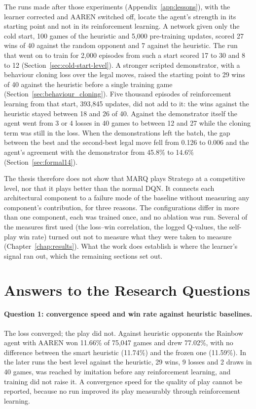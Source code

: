 The runs made after those experiments (Appendix~\ref{app:lessons}), with the learner corrected and AAREN switched off, locate the agent's strength in its starting point and not in its reinforcement learning. A network given only the cold start, 100 games of the heuristic and 5,000 pre-training updates, scored 27 wins of 40 against the random opponent and 7 against the heuristic. The run that went on to train for 2,000 episodes from such a start scored 17 to 30 and 8 to 12 (Section~\ref{sec:cold-start-level}). A stronger scripted demonstrator, with a behaviour cloning loss over the legal moves, raised the starting point to 29 wins of 40 against the heuristic before a single training game (Section~\ref{sec:behaviour_cloning}). Five thousand episodes of reinforcement learning from that start, 393,845 updates, did not add to it: the wins against the heuristic stayed between 18 and 26 of 40. Against the demonstrator itself the agent went from 3 or 4 losses in 40 games to between 12 and 27 while the cloning term was still in the loss. When the demonstrations left the batch, the gap between the best and the second-best legal move fell from 0.126 to 0.006 and the agent's agreement with the demonstrator from 45.8\% to 14.6\% (Section~\ref{sec:formal14}).

The thesis therefore does not show that MARQ plays Stratego at a competitive level, nor that it plays better than the normal DQN. It connects each architectural component to a failure mode of the baseline without measuring any component's contribution, for three reasons. The configurations differ in more than one component, each was trained once, and no ablation was run. Several of the measures first used (the loss--win correlation, the logged Q-values, the self-play win rate) turned out not to measure what they were taken to measure (Chapter~\ref{chap:results}). What the work does establish is where the learner's signal ran out, which the remaining sections set out.

\section{Answers to the Research Questions}

\paragraph{Question 1: convergence speed and win rate against heuristic baselines.} The loss converged; the play did not. Against heuristic opponents the Rainbow agent with AAREN won 11.66\% of 75,047 games and drew 77.02\%, with no difference between the smart heuristic (11.74\%) and the frozen one (11.59\%). In the later runs the best level against the heuristic, 29 wins, 9 losses and 2 draws in 40 games, was reached by imitation before any reinforcement learning, and training did not raise it. A convergence speed for the quality of play cannot be reported, because no run improved its play measurably through reinforcement learning.

